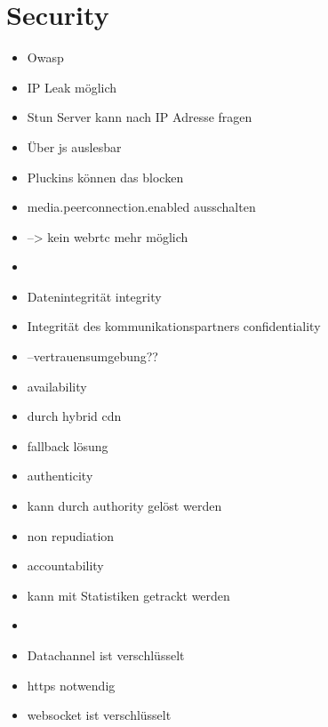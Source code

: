 \section{Security}
\begin{itemize}
	\item Owasp
	\item IP Leak möglich
	\item Stun Server kann nach IP Adresse fragen
	\item Über js auslesbar
	\item Pluckins können das blocken
	\item media.peerconnection.enabled ausschalten
	\item --> kein webrtc mehr möglich
	\item 
	\item Datenintegrität integrity
	\item Integrität des kommunikationspartners confidentiality
	\item 	--vertrauensumgebung??
	\item availability
	\item durch hybrid cdn 
	\item fallback lösung
	\item authenticity
	\item kann durch authority gelöst werden
	\item non repudiation
	\item accountability
	\item kann mit Statistiken getrackt werden
	\item 
	\item Datachannel ist verschlüsselt
	\item https notwendig
	\item websocket ist verschlüsselt

\end{itemize}

